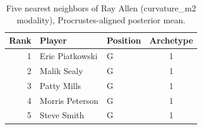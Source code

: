\begin{table}[htbp]
  \centering\small
  \begin{tabular}{rllc}
    \toprule
    Rank & Player & Position & Archetype \\
    \midrule
    1 & Eric Piatkowski & G & 1 \\
    2 & Malik Sealy & G & 1 \\
    3 & Patty Mills & G & 1 \\
    4 & Morris Peterson & G & 1 \\
    5 & Steve Smith & G & 1 \\
    \bottomrule
  \end{tabular}
  \caption{Five nearest neighbors of Ray Allen (curvature_m2 modality), Procrustes-aligned posterior mean.}
  \label{tab:Ray_Allen_neighbors_curvature_m2}
\end{table}

